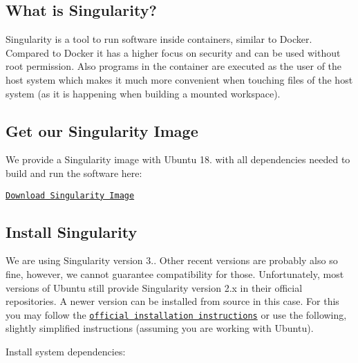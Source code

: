 \subsection*{What is Singularity? }

Singularity is a tool to run software inside containers, similar to Docker. Compared to Docker it has a higher focus on security and can be used without root permission. Also programs in the container are executed as the user of the host system which makes it much more convenient when touching files of the host system (as it is happening when building a mounted workspace).

\subsection*{Get our Singularity Image }

We provide a Singularity image with Ubuntu 18. with all dependencies needed to build and run the software here\+:


\begin{DoxyItemize}
\item \href{https://drive.google.com/file/d/1yJ_RI1GpnPcs_fxcNYYUXZtQPHvhlGNH/view?usp=sharing}{\tt Download Singularity Image}
\end{DoxyItemize}

\subsection*{Install Singularity }

We are using Singularity version 3.. Other recent versions are probably also so fine, however, we cannot guarantee compatibility for those. Unfortunately, most versions of Ubuntu still provide Singularity version 2.\+x in their official repositories. A newer version can be installed from source in this case. For this you may follow the \href{https://sylabs.io/guides/3.6/user-guide/quick_start.html#quick-installation-steps}{\tt official installation instructions} or use the following, slightly simplified instructions (assuming you are working with Ubuntu).

Install system dependencies\+: 


